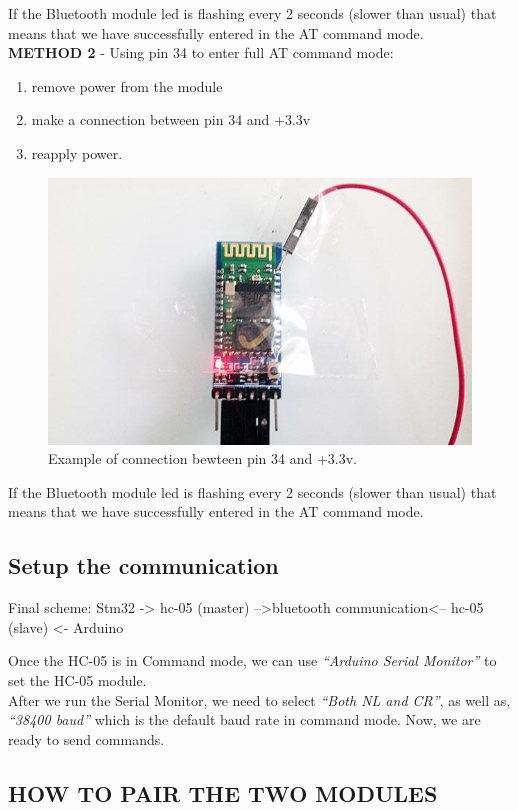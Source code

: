 If the Bluetooth module led is flashing every 2 seconds (slower than usual) that means that we have successfully entered in the AT command mode.\\
\textbf{METHOD 2} - Using pin 34 to enter full AT command mode:
\begin{enumerate}
	\item remove power from the module
	\item make a connection between pin 34 and +3.3v
	\item reapply power.
\end{enumerate}
\begin{figure}[H]
	\centering
	\includegraphics[width=\textwidth]
	{files/images/hc05_pin34}
	\caption{Example of connection bewteen pin 34 and +3.3v.}
\end{figure}
If the Bluetooth module led is flashing every 2 seconds (slower than usual) that means that we have successfully entered in the AT command mode.

\subsection{Setup the communication}
Final scheme:
Stm32 -> hc-05 (master)    -->bluetooth communication<--    hc-05 (slave) <- Arduino

Once the HC-05 is in Command mode, we can use \textit{“Arduino Serial Monitor”} to set the HC-05 module.\\
After we run the Serial Monitor, we need to select \textit{“Both NL and CR”}, as well as, \textit{“38400 baud”} which is the default baud rate in command mode. Now, we are ready to send commands.\\

\subsection{HOW TO PAIR THE TWO MODULES}

